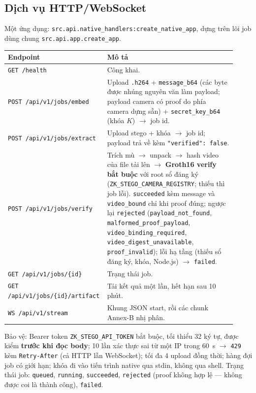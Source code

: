 \documentclass[11pt,a4paper]{article}
\begin{document}
\subsection{Dịch vụ HTTP/WebSocket}

Một ứng dụng: \texttt{src.api.native\_handlers:create\_native\_app}, dựng trên lõi job
dùng chung \texttt{src.api.app.create\_app}.

\begin{center}
\small
\begin{tabular}{p{0.36\linewidth}p{0.56\linewidth}}
\toprule
Endpoint & Mô tả \\
\midrule
\texttt{GET /health} & Công khai. \\
\texttt{POST /api/v1/jobs/embed} & Upload \texttt{.h264} + \texttt{message\_b64} (các byte được nhúng nguyên văn làm payload; payload camera có proof do phía camera dựng sẵn) + \texttt{secret\_key\_b64} (khóa \(K\)) \(\rightarrow\) job id. \\
\texttt{POST /api/v1/jobs/extract} & Upload stego + khóa \(\rightarrow\) job id; payload trả về kèm \texttt{"verified": false}. \\
\texttt{POST /api/v1/jobs/verify} & Trích mù \(\rightarrow\) unpack \(\rightarrow\) hash video của file tải lên \(\rightarrow\) \textbf{Groth16 verify bắt buộc} với root sổ đăng ký (\texttt{ZK\_STEGO\_CAMERA\_REGISTRY}; thiếu thì job lỗi). \texttt{succeeded} kèm message và \texttt{video\_bound} chỉ khi proof đúng; ngược lại \texttt{rejected} (\texttt{payload\_not\_found}, \texttt{malformed\_proof\_payload}, \texttt{video\_binding\_required}, \texttt{video\_digest\_unavailable}, \texttt{proof\_invalid}); lỗi hạ tầng (thiếu sổ đăng ký, khóa, Node.js) \(\rightarrow\) \texttt{failed}. \\
\texttt{GET /api/v1/jobs/\{id\}} & Trạng thái job. \\
\texttt{GET /api/v1/jobs/\{id\}/artifact} & Tải kết quả một lần, hết hạn sau 10 phút. \\
\texttt{WS /api/v1/stream} & Khung JSON start, rồi các chunk Annex-B nhị phân. \\
\bottomrule
\end{tabular}
\end{center}

Bảo vệ: Bearer token \texttt{ZK\_STEGO\_API\_TOKEN} bắt buộc, tối thiểu 32 ký tự, được
kiểm \textbf{trước khi đọc body}; 10 lần xác thực sai từ một IP trong 60~s
\(\rightarrow\) \texttt{429} kèm \texttt{Retry-After} (cả HTTP lẫn WebSocket); tối đa 4
upload đồng thời; hàng đợi job có giới hạn; khóa đi vào tiến trình native qua stdin,
không qua shell. Trạng thái job: \texttt{queued}, \texttt{running}, \texttt{succeeded},
\texttt{rejected} (proof không hợp lệ --- không được coi là thành công), \texttt{failed}.
\end{document}
